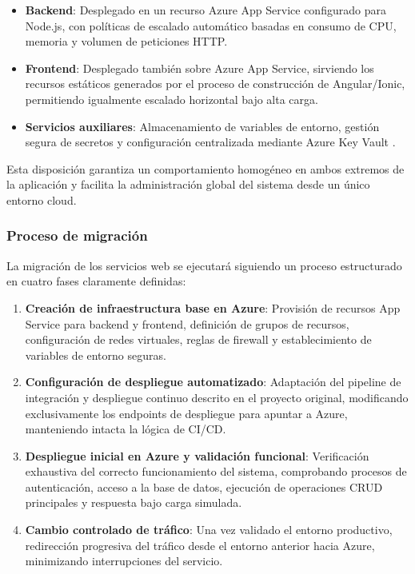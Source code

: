 \begin{itemize}
    \item \textbf{Backend}: Desplegado en un recurso Azure App Service configurado para Node.js, con políticas de escalado automático basadas en consumo de CPU, memoria y volumen de peticiones HTTP.
    
    \item \textbf{Frontend}: Desplegado también sobre Azure App Service, sirviendo los recursos estáticos generados por el proceso de construcción de Angular/Ionic, permitiendo igualmente escalado horizontal bajo alta carga.
    
    \item \textbf{Servicios auxiliares}: Almacenamiento de variables de entorno, gestión segura de secretos y configuración centralizada mediante Azure Key Vault \cite{azure_key_vault_docs}.
\end{itemize}

Esta disposición garantiza un comportamiento homogéneo en ambos extremos de la aplicación y facilita la administración global del sistema desde un único entorno cloud.

\subsubsection{Proceso de migración}

La migración de los servicios web se ejecutará siguiendo un proceso estructurado en cuatro fases claramente definidas:

\begin{enumerate}
    \item \textbf{Creación de infraestructura base en Azure}: Provisión de recursos App Service para backend y frontend, definición de grupos de recursos, configuración de redes virtuales, reglas de firewall y establecimiento de variables de entorno seguras.
    
    \item \textbf{Configuración de despliegue automatizado}: Adaptación del pipeline de integración y despliegue continuo descrito en el proyecto original, modificando exclusivamente los endpoints de despliegue para apuntar a Azure, manteniendo intacta la lógica de CI/CD.
    
    \item \textbf{Despliegue inicial en Azure y validación funcional}: Verificación exhaustiva del correcto funcionamiento del sistema, comprobando procesos de autenticación, acceso a la base de datos, ejecución de operaciones CRUD principales y respuesta bajo carga simulada.
    
    \item \textbf{Cambio controlado de tráfico}: Una vez validado el entorno productivo, redirección progresiva del tráfico desde el entorno anterior hacia Azure, minimizando interrupciones del servicio.
\end{enumerate}

